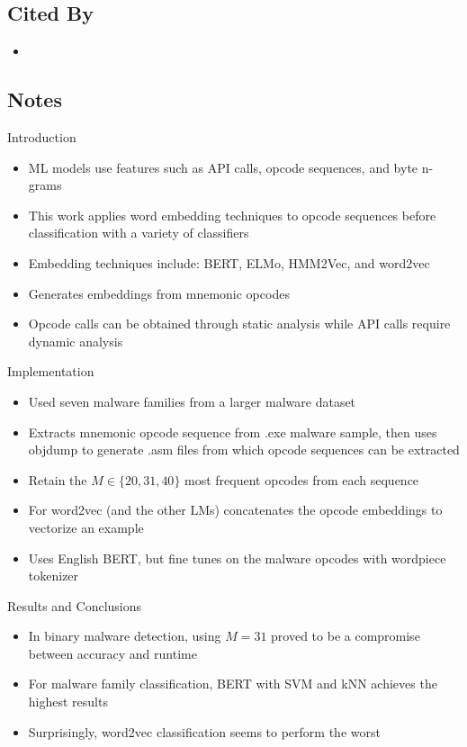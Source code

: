 \documentclass{article}
\begin{document}
\subsection*{Cited By}
\begin{itemize}
\item
\end{itemize}

\subsection*{Notes}

Introduction
\begin{itemize}
\item ML models use features such as API calls, opcode sequences, and byte n-grams
\item This work applies word embedding techniques to opcode sequences before classification with a variety of classifiers
\item  Embedding techniques include: BERT, ELMo, HMM2Vec, and word2vec
\item Generates embeddings from mnemonic opcodes
\item Opcode calls can be obtained through static analysis while API calls require dynamic analysis
\end{itemize}
Implementation
\begin{itemize}
\item Used seven malware families from a larger malware dataset
\item Extracts mnemonic opcode sequence from .exe malware sample, then uses objdump to generate .asm files from which opcode sequences can be extracted
\item Retain the $M \in \{20, 31, 40\}$ most frequent opcodes from each sequence
\item For word2vec (and the other LMs) concatenates the opcode embeddings to vectorize an example
\item Uses English BERT, but fine tunes on the malware opcodes with wordpiece tokenizer
\end{itemize}
Results and Conclusions
\begin{itemize}
\item In binary malware detection, using $M=31$ proved to be a compromise between accuracy and runtime
\item For malware family classification, BERT with SVM and kNN achieves the highest results
\item Surprisingly, word2vec classification seems to perform the worst
\end{itemize}
\end{document}
